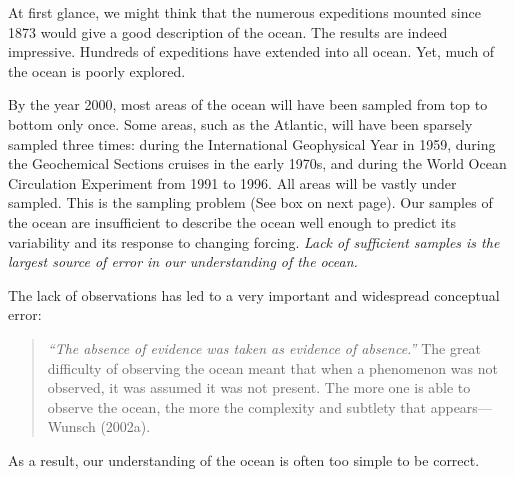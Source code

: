 At first glance, we might think that the numerous expeditions mounted
since 1873 would give a good description of the ocean. The results are
indeed impressive. Hundreds of expeditions have extended into all
ocean. Yet, much of the ocean is poorly explored.

By the year 2000, most areas of the ocean will have been sampled from
top to bottom only once. Some areas, such as the Atlantic, will have
been sparsely sampled three times: during the International
Geophysical Year in 1959, during the Geochemical Sections cruises in
the early 1970s, and during the World Ocean Circulation
Experiment from 1991 to
1996. All areas will be vastly under sampled. This is the sampling
problem (See box on next page). Our samples of
the ocean are insufficient to describe the ocean well enough to
predict its variability and its response to changing
forcing. \textit{Lack of sufficient samples is the largest source of
  error in our understanding of the ocean.}

The lack of observations has led to a very important and widespread
conceptual error:
\begin{quote} \small
\textit{``The absence of evidence was taken as evidence of absence.''}
The great difficulty of observing the ocean meant that when a
phenomenon was not observed, it was assumed it was not present. The
more one is able to observe the ocean, the more the complexity and
subtlety that appears---Wunsch (2002a).
\end{quote}
As a result, our understanding of the ocean is often too simple to be
correct.

